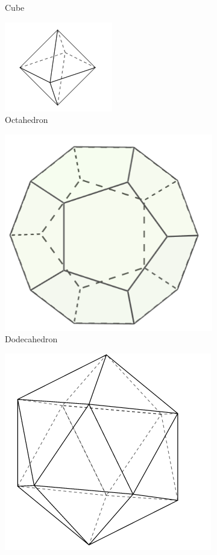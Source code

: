 \documentclass{article}
\begin{document}
\begin{figure} [hbt!]
\begin{subfigure}[b]{.45\linewidth}
                    \caption*{Cube}
                \end{subfigure}
                \begin{subfigure}[b]{.45\linewidth}
                    \includegraphics[scale=1]{Resources/Unit6Solids/octahedron.PNG}
                    \caption*{Octahedron}
                \end{subfigure}
                \begin{subfigure}[b]{.45\linewidth}
                    \includegraphics[scale=0.25]{Resources/Unit6Solids/dodecahedron.PNG}
                    \caption*{Dodecahedron}
                \end{subfigure}
                \begin{subfigure}[b]{.45\linewidth}
                    \includegraphics[scale=0.4]{Resources/Unit6Solids/icosahedron.PNG}

\end{subfigure}
\end{figure}
\end{document}
